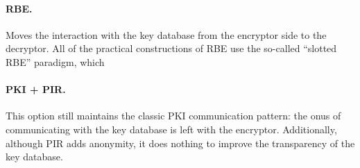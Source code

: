 \paragraph{RBE.} Moves the interaction with the key database from the encryptor side to the decryptor. All  of the practical constructions of RBE use the so-called ``slotted RBE'' paradigm, which 
\paragraph{PKI + PIR.} This option still maintains the classic PKI communication pattern: the onus of communicating with the key database is left with the encryptor. Additionally, although PIR adds anonymity, it does nothing to improve the transparency of the key database.